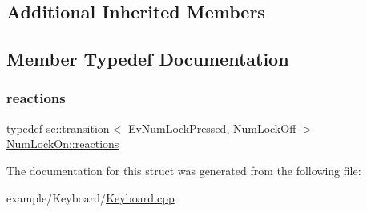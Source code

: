 \subsection*{Additional Inherited Members}


\subsection{Member Typedef Documentation}
\mbox{\label{struct_num_lock_on_a9af5eef535acd3b1a829bfa8e8c49849}} 
\subsubsection{\texorpdfstring{reactions}{reactions}}
{\footnotesize\ttfamily typedef \mbox{\hyperlink{classboost_1_1statechart_1_1transition}{sc\+::transition}}$<$ \mbox{\hyperlink{struct_ev_num_lock_pressed}{Ev\+Num\+Lock\+Pressed}}, \mbox{\hyperlink{struct_num_lock_off}{Num\+Lock\+Off}} $>$ \mbox{\hyperlink{struct_num_lock_on_a9af5eef535acd3b1a829bfa8e8c49849}{Num\+Lock\+On\+::reactions}}}



The documentation for this struct was generated from the following file\+:\begin{DoxyCompactItemize}
\item 
example/\+Keyboard/\mbox{\hyperlink{_keyboard_8cpp}{Keyboard.\+cpp}}\end{DoxyCompactItemize}
